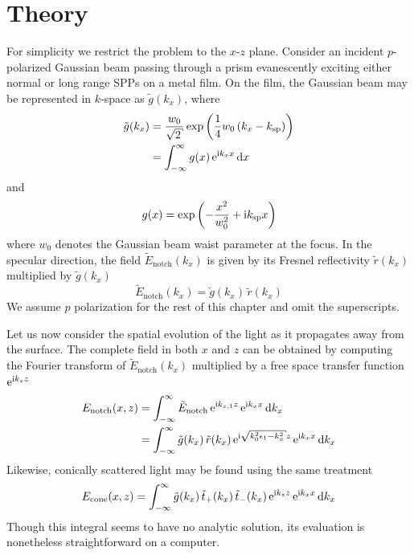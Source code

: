 \section{Theory} \label{sec:interferencetheory}
For simplicity we restrict the problem to the $x$-$z$ plane.  Consider an
incident $p$-polarized Gaussian beam passing through a prism evanescently
exciting either normal or long range SPPs on a metal film.  On the film,
the Gaussian beam may be represented in $k$-space as $\tilde{g}(k_x)$,
where
\begin{align}
\tilde{g}(k_x) &= \frac{w_0}{\sqrt{2}} \exp\left(\frac{1}{4}w_0\left(k_x - \ksp\right)\right)\\
&= \intinfty g(x)\, \me^{\mi k_x x} \md x
\end{align}
and
\begin{equation}
g(x) = \exp\left(-\frac{x^2}{w_0^2} + {\mathrm{i}} k_\mathrm{sp} x\right)
\end{equation}
where $w_0$ denotes the Gaussian beam waist parameter at the focus.  In the
specular direction, the field $\tilde{E}_\mathrm{notch}(k_x)$ is given by its
Fresnel reflectivity $\tilde{r}(k_x)$ multiplied by $\tilde{g}(k_x)$
\begin{equation}
\tilde{E}_\mathrm{notch}(k_x)=\tilde{g}(k_x)\,\tilde{r}(k_x)
\end{equation}
We assume $p$ polarization for the rest of this chapter and omit the
superscripts.

Let us now consider the spatial evolution of the light as it propagates
away from the surface.
The complete field in both $x$ and $z$ can be obtained by computing
the Fourier transform of $\tilde{E}_\mathrm{notch}(k_x)$ multiplied 
by a free space transfer function ${\mathrm{e}}^{{\mathrm{i}} k_{z} z}$
\begin{align}
E_\mathrm{notch}(x,z) &= \intinfty \tilde{E}_\mathrm{notch}\, \me^{\mi k_{z,1} z}\, \me^{\mi k_x x} \md k_x\\
 &= \intinfty \tilde{g}(k_x)\, \tilde{r}(k_x)\, \me^{\mi \sqrt{k_0^2 \epsilon_1 - k_x^2}z}\, \me^{\mi k_x x} \md k_x
\label{eqn:fourier123}
\end{align}
Likewise, conically scattered light may be found using the same treatment
\begin{align}
E_\text{cone}(x,z) = \int_{-\infty}^{\infty} \tilde{g}(k_x)\, 
\tilde{t}_+(k_x)\, \tilde{t}_-(k_x)\,{\mathrm{e}}^{{\mathrm{i}} k_z z}\, {\mathrm{e}}^{{\mathrm{i}} k_x x} \,\mathrm{d} k_x
\label{eqn:fourier321}
\end{align}
Though this integral seems to have no analytic solution, its evaluation is
nonetheless straightforward on a computer.

